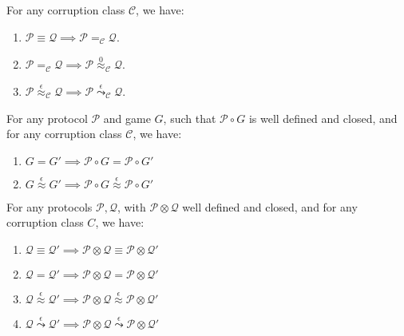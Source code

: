 \begin{theorem}
For any corruption class $\mathcal{C}$, we have:
\begin{enumerate}
\item $\mathcal{P} \equiv \mathcal{Q} \implies \mathcal{P} =_\mathcal{C} \mathcal{Q}$.
\item $\mathcal{P} =_{\mathcal{C}} \mathcal{Q} \implies \mathcal{P} \overset{0}{\approx}_\mathcal{C} \mathcal{Q}$.
\item $\mathcal{P} \overset{\epsilon}{\approx}_{\mathcal{C}} \mathcal{Q} \implies \mathcal{P} \overset{\epsilon}{\leadsto}_\mathcal{C} \mathcal{Q}$.
\end{enumerate}

 
\end{theorem}

\begin{theorem}
  For any protocol $\mathcal{P}$ and game $G$, such that $\mathcal{P} \circ G$
  is well defined and closed, and for any corruption class $\mathcal{C}$, we have:
  \begin{enumerate}
    \item $G = G' \implies \mathcal{P} \circ G = \mathcal{P} \circ G'$
    \item $G \overset{\epsilon}{\approx} G' \implies \mathcal{P} \circ G \overset{\epsilon}{\approx} \mathcal{P} \circ G'$
  \end{enumerate}
  
 
\end{theorem}

\begin{theorem}
  For any protocols $\mathcal{P}, \mathcal{Q}$, with $\mathcal{P} \otimes \mathcal{Q}$
  well defined and closed, and for any corruption class $C$, we have:
  \begin{enumerate}
    \item $\mathcal{Q} \equiv \mathcal{Q}' \implies \mathcal{P} \otimes \mathcal{Q} \equiv \mathcal{P} \otimes \mathcal{Q}'$
    \item $\mathcal{Q} = \mathcal{Q}' \implies \mathcal{P} \otimes \mathcal{Q} = \mathcal{P} \otimes \mathcal{Q}'$
    \item $\mathcal{Q} \overset{\epsilon}{\approx} \mathcal{Q}' \implies \mathcal{P} \otimes \mathcal{Q} \overset{\epsilon}{\approx} \mathcal{P} \otimes \mathcal{Q}'$
    \item $\mathcal{Q} \overset{\epsilon}{\leadsto} \mathcal{Q}' \implies \mathcal{P} \otimes \mathcal{Q} \overset{\epsilon}{\leadsto} \mathcal{P} \otimes \mathcal{Q}'$
  \end{enumerate}

   
\end{theorem}

